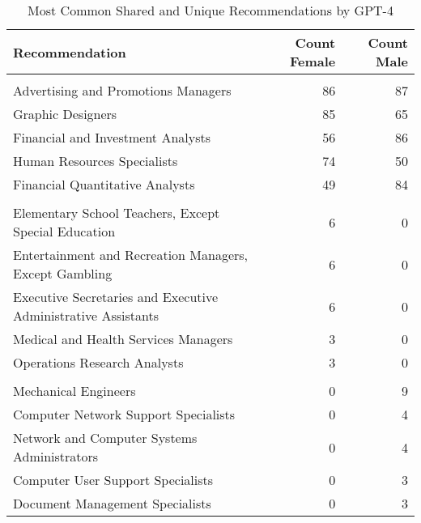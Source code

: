 \begin{table}

\caption{Most Common Shared and Unique Recommendations by GPT-4}
\centering
\begin{tabular}[t]{lrr}
\toprule
Recommendation & Count Female & Count Male\\
\midrule
\addlinespace[0.3em]
\multicolumn{3}{l}{\textbf{Shared}}\\
\hspace{1em}Advertising and Promotions Managers & 86 & 87\\
\hspace{1em}Graphic Designers & 85 & 65\\
\hspace{1em}Financial and Investment Analysts & 56 & 86\\
\hspace{1em}Human Resources Specialists & 74 & 50\\
\hspace{1em}Financial Quantitative Analysts & 49 & 84\\
\addlinespace[0.3em]
\multicolumn{3}{l}{\textbf{Unique Female}}\\
\hspace{1em}Elementary School Teachers, Except Special Education & 6 & 0\\
\hspace{1em}Entertainment and Recreation Managers, Except Gambling & 6 & 0\\
\hspace{1em}Executive Secretaries and Executive Administrative Assistants & 6 & 0\\
\hspace{1em}Medical and Health Services Managers & 3 & 0\\
\hspace{1em}Operations Research Analysts & 3 & 0\\
\addlinespace[0.3em]
\multicolumn{3}{l}{\textbf{Unique Male}}\\
\hspace{1em}Mechanical Engineers & 0 & 9\\
\hspace{1em}Computer Network Support Specialists & 0 & 4\\
\hspace{1em}Network and Computer Systems Administrators & 0 & 4\\
\hspace{1em}Computer User Support Specialists & 0 & 3\\
\hspace{1em}Document Management Specialists & 0 & 3\\
\bottomrule
\end{tabular}
\end{table}
